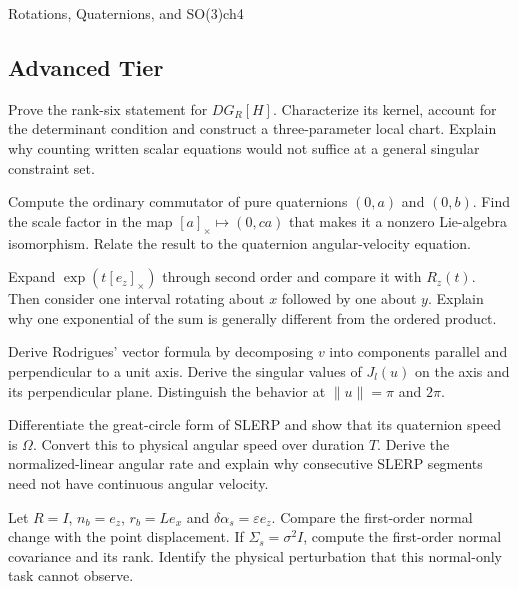 \begin{exercises}{Rotations, Quaternions, and SO(3)}{ch4}
\subsection{Advanced Tier}

\begin{exercise}
\label{ex:so3_manifold_dimension}
Prove the rank-six statement for $DG_R[H]$. Characterize its kernel, account for the determinant condition and construct a three-parameter local chart. Explain why counting written scalar equations would not suffice at a general singular constraint set.
\end{exercise}

\begin{exercise}
\label{ex:quaternion_lie_algebra}
Compute the ordinary commutator of pure quaternions $(0,a)$ and $(0,b)$. Find the scale factor in the map $[a]_\times\mapsto(0,ca)$ that makes it a nonzero Lie-algebra isomorphism. Relate the result to the quaternion angular-velocity equation.
\end{exercise}

\begin{exercise}
\label{ex:matrix_exponential}
Expand $\exp(t[e_z]_\times)$ through second order and compare it with $R_z(t)$. Then consider one interval rotating about $x$ followed by one about $y$. Explain why one exponential of the sum is generally different from the ordered product.
\end{exercise}

\begin{exercise}
\label{ex:rodrigues_derivation}
Derive Rodrigues' vector formula by decomposing $v$ into components parallel and perpendicular to a unit axis. Derive the singular values of $J_l(u)$ on the axis and its perpendicular plane. Distinguish the behavior at $\|u\|=\pi$ and $2\pi$.
\end{exercise}

\begin{exercise}
\label{ex:quaternion_interpolation_constant_speed}
Differentiate the great-circle form of SLERP and show that its quaternion speed is $\Omega$. Convert this to physical angular speed over duration $T$. Derive the normalized-linear angular rate and explain why consecutive SLERP segments need not have continuous angular velocity.
\end{exercise}

\begin{exercise}
\label{ex:rotation_task_sensitivity}
Let $R=I$, $n_b=e_z$, $r_b=L e_x$ and $\delta\alpha_s=\varepsilon e_z$. Compare the first-order normal change with the point displacement. If $\Sigma_s=\sigma^2I$, compute the first-order normal covariance and its rank. Identify the physical perturbation that this normal-only task cannot observe.
\end{exercise}


\end{exercises}
